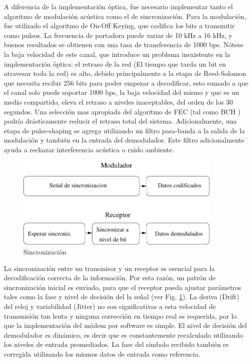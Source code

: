 A diferencia de la implementación óptica, fue necesario implementar tanto el algoritmo de modulación acústica como el de sincronización.
Para la modulación, fue utilizado el algoritmo de On-Off Keying, que codifica los bits a transmitir como pulsos. La frecuencia de portadora puede variar de 10 kHz a 16 kHz, y buenos resultados se obtienen con una tasa de transferencia de 1000 bps. Nótese la baja velocidad de este canal, que introduce un problema inexistente en la implementación óptica: el retraso de la red (El tiempo que tarda un bit en atravesar toda la red) es alto, debido principalmente a la etapa de Reed-Solomon que necesita recibir 256 bits para poder empezar a decodificar, esto sumado a que el canal solo puede soportar 1000 bps, la baja velocidad del mismo y que es un medio compartido, eleva el retraso a niveles inaceptables, del orden de los 30 segundos.
Una selección mas apropiada del algoritmo de FEC (tal como BCH \cite{Moon:05}) podría drásticamente reducir el retraso total del sistema.
Adicionalmente, una etapa de pulse-shaping se agrega utilizando un filtro pasa-banda a la salida de la modulación y también en la entrada del demodulador. Este filtro adicionalmente ayuda a rechazar interferencia acústica o ruido ambiente.

\begin{figure}[t]
  \centering
    \includegraphics[width=4in]{graphs/Audio-Sync2.pdf}
    \caption{Sincronización}
    \label{arch:sync}
\end{figure}



La sincronización entre un transmisor y un receptor es esencial para la decodificación correcta de la información. Por esta razón, un patrón de sincronización inicial es enviado, para que el receptor pueda ajustar parámetros tales como la fase y nivel de decisión del la señal (ver Fig. \ref{arch:sync}). La deriva (Drift) del reloj y variabilidad (Jitter) no son significativas a esta velocidad de transmisión tan lenta y ninguna corrección en tiempo real es requerida, por lo que la implementación del módem por software es simple.
El nivel de decisión del demodulador es dinámico, es decir que es constantemente recalculado utilizando los niveles de entrada promediados.
La fase del símbolo recibido también es corregida utilizando los mismos datos de entrada como referencia.

